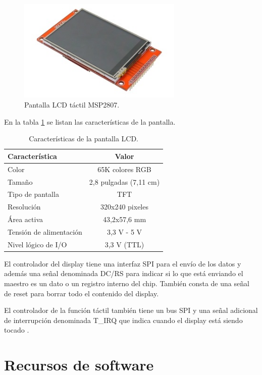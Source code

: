 \begin{figure}[H]
\centering
\includegraphics[width=0.7\textwidth]{./Figures/pant_LCD.png}
\caption{Pantalla LCD táctil MSP2807.}
\label{fig:pantLCD}
\end{figure}

En la tabla \ref{tab:caractLCD} se listan las características de la pantalla.

\begin{table}[H]
	\centering
	\caption{Características de la pantalla LCD.}
	\begin{tabular}{l c}
		\toprule
		\textbf{Característica}	& \textbf{Valor} \\
		\midrule
		Color				& 65K colores RGB \\
		Tamaño				& 2,8 pulgadas (7,11 cm) \\
		Tipo de pantalla	& TFT \\
		Resolución			& 320x240 pixeles \\
		Área activa			& 43,2x57,6 mm \\
		Tensión de alimentación		& 3,3 V - 5 V \\
		Nivel lógico de I/O			& 3,3 V (TTL) \\		
		\bottomrule
		\hline
	\end{tabular}
	\label{tab:caractLCD}
\end{table}

El controlador del display tiene una interfaz SPI para el envío de los datos y además una señal denominada DC/RS para indicar si lo que está enviando el maestro es un dato o un registro interno del chip. También consta de una señal de reset para borrar todo el contenido del display.

El controlador de la función táctil también tiene un bus SPI y una señal adicional de interrupción denominada T\_IRQ que indica cuando el display está siendo tocado \citep{MSP2807}.

\section{Recursos de software}

